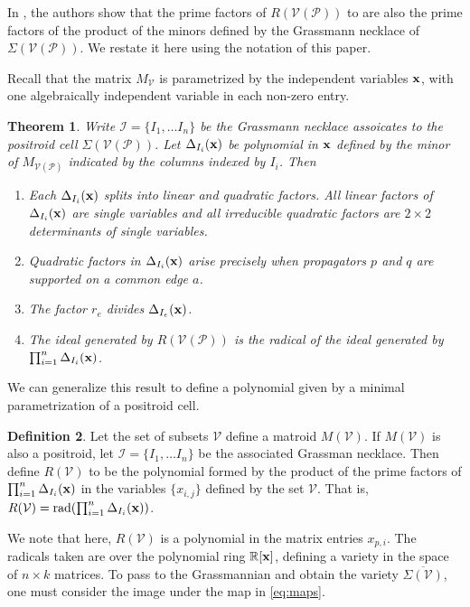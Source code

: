 \documentclass[11pt]{article}
\newcommand{\R}{\mathbb{R}}
\newcommand{\cP}{\mathcal{P}}
\newcommand{\cV}{\mathcal{V}}
\newcommand{\VP}{\cV(\cP)}
\newcommand{\cI}{\mathcal{I}}
\newtheorem{thm}{Theorem}[section]
\theoremstyle{remark}
\theoremstyle{definition}
\newtheorem{dfn}[thm]{Definition}
\begin{document}
In \cite{generalcombinatoricsII}, the authors show that the prime factors of $R(\VP)$ to are also the prime factors of the product of the minors defined by the Grassmann necklace of $\Sigma(\VP)$. We restate it here using the notation of this paper.

Recall that the matrix $M_{\cV}$ is parametrized by the independent variables $\bf{x}$, with one algebraically independent variable in each non-zero entry.

\begin{thm} \cite[Proposition 5.3]{generalcombinatoricsII} \label{res:prop alg gives rad}
Write $\cI = \{I_1, \ldots I_n\}$ be the Grassmann necklace assoicates to the positroid cell $\Sigma(\VP)$. Let $\Delta_{I_i}(\bf{x})$ be polynomial in $\bf{x}$ defined by the minor of $M_{\VP}$ indicated by the columns indexed by $I_i$.  Then \begin{enumerate}
 
   \item Each $\Delta_{I_i}(\bf{x})$ splits into linear and quadratic factors.  All linear factors of  $\Delta_{I_i}(\bf{x})$ are single variables and all irreducible quadratic factors are $2\times 2$ determinants of single variables.
    \item Quadratic factors in $\Delta_{I_i}(\bf{x})$ arise precisely when propagators $p$ and $q$ are supported on a common edge $a$.
    \item The factor $r_e$ divides $\Delta_{I_e}(\bf{x})$.
    \item The ideal generated by $R(\VP)$ is the radical of the ideal generated by $\prod_{i=1}^{n}\Delta_{I_i}(\bf{x})$.
  \end{enumerate}
\end{thm}

We can generalize this result to define a polynomial given by a minimal parametrization of a positroid cell. 

\begin{dfn}\label{dfn:RV}
Let the set of subsets $\cV$ define a matroid $M(\cV)$. If $M(\cV)$ is also a positroid, let $\cI =  \{I_1, \ldots I_n\}$ be the associated Grassman necklace. Then define $R(\cV)$ to be the polynomial formed by the product of the prime factors of $\prod_{i=1}^{n}\Delta_{I_i}(\bf{x})$ in the variables $\{x_{i,j}\}$ defined by the set $\cV$. That is, $R(\cV) = \textrm{rad}(\prod_{i=1}^{n}\Delta_{I_i}(\bf{x}))$. 
\end{dfn}

We note that here, $R(\cV)$ is a polynomial in the matrix entries $x_{p,i}$. The radicals taken are over the polynomial ring $\R[\bf{x}]$, defining a variety in the space of $n \times k$ matrices. To pass to the Grassmannian and obtain the variety $\overline{\Sigma(\cV)}$, one must consider the image under the map in \eqref{eq:maps}. 
\end{document}
